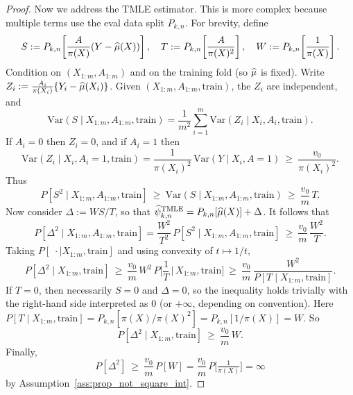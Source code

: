 \begin{proof}
Now we address the TMLE estimator. This is more complex because multiple terms use the eval data split $P_{k,n}$. 
For brevity, define
$$
S := {P}_{k,n}\!\left[\frac{A}{\pi(X)} (Y-\widehat{\mu}(X))\right], 
\quad 
T := {P}_{k,n}\!\left[\frac{A}{\pi(X)^2}\right],
\quad 
W := {P}_{k,n}\!\left[\frac{1}{\pi(X)}\right].
$$
Condition on $(X_{1:m},A_{1:m})$ and on the training fold (so $\widehat{\mu}$ is fixed).
Write $Z_i := \frac{A_i}{\pi(X_i)}\{Y_i-\widehat{\mu}(X_i)\}$.  
Given $(X_{1:m},A_{1:m},\text{train})$, the $Z_i$ are independent, and
\[
\mathrm{Var}(S\mid X_{1:m},A_{1:m},\text{train})
= \frac{1}{m^2}\sum_{i=1}^m \mathrm{Var}(Z_i\mid X_i,A_i,\text{train}).
\]
If $A_i=0$ then $Z_i=0$, and
if $A_i=1$ then 
\[
\mathrm{Var}(Z_i\mid X_i,A_i=1,\text{train})
=\frac{1}{\pi(X_i)^2}\,\mathrm{Var}(Y\mid X_i,A=1)
\ \ge\ \frac{v_0}{\pi(X_i)^2}.
\]
Thus
\[
P[S^2\mid X_{1:m},A_{1:m},\text{train}]
\ \ge\ \mathrm{Var}(S\mid X_{1:m},A_{1:m},\text{train})
\ \ge\ \frac{v_0}{m}\,T.
\]
Now consider $\Delta:=WS/T$, so that $\widehat{\psi}_{k,n}^{\rm TMLE}=P_{k,n}[\widehat{\mu}(X)]+\Delta$. It follows that
\[
P[\Delta^2\mid X_{1:m},A_{1:m},\text{train}]
= \frac{W^2}{T^2}\,P[S^2\mid X_{1:m},A_{1:m},\text{train}]
\ \ge\ \frac{v_0}{m}\,\frac{W^2}{T}.
\]
Taking $P[\;\cdot\mid X_{1:m},\text{train}]$ and using convexity of $t\mapsto 1/t$,
\[
P[\Delta^2\mid X_{1:m},\text{train}]
\ \ge\ \frac{v_0}{m}\,W^2\,P\!\Big[\frac{1}{T}\,\Big|\,X_{1:m},\text{train}\Big]
\ \ge\ \frac{v_0}{m}\,\frac{W^2}{P[T\mid X_{1:m},\text{train}]}.
\]
If $T=0$, then necessarily $S=0$ and $\Delta=0$, so the inequality holds
trivially with the right-hand side interpreted as $0$ (or $+\infty$, depending on convention).
Here $P[T\mid X_{1:m},\text{train}]
= P_{k,n}[\pi(X)/\pi(X)^2]
= P_{k,n}[1/\pi(X)] = W$.
So
\[
P[\Delta^2\mid X_{1:m},\text{train}] \ \ge\ \frac{v_0}{m}\,W.
\]
Finally,
\[
P[\Delta^2] \ \ge\ \frac{v_0}{m}\,P[W]
= \frac{v_0}{m}\,P\!\Big[\tfrac{1}{\pi(X)}\Big]
= \infty
\]
by Assumption~\ref{ass:prop_not_square_int}. 
\end{proof}
\label{sec:theory_simple_more-end}
